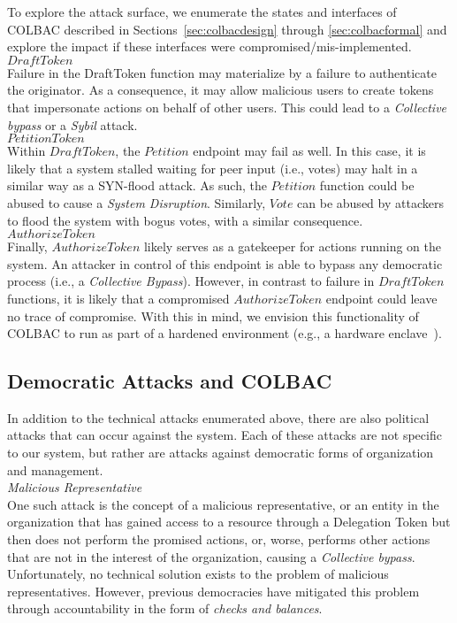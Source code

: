 To explore the attack surface, we enumerate the states and interfaces of
COLBAC described in Sections~\ref{sec:colbacdesign} through 
\ref{sec:colbacformal} and explore the impact if these interfaces were
compromised/mis-implemented.\\

\noindent$DraftToken$\mbox{}\\
Failure in the DraftToken function may materialize by a failure to authenticate
the originator. As a consequence, it may allow malicious users to create tokens
that impersonate actions on behalf of other users. This could lead to a
\emph{Collective bypass} or a \emph{Sybil} attack.\\

\noindent$PetitionToken$\mbox{}\\
Within $DraftToken$, the $Petition$ endpoint may fail as well. In this case, it
is likely that a system stalled waiting for peer input (i.e., votes) may halt
in a similar way as a SYN-flood attack. As such, the $Petition$ function could
be abused to cause a \emph{System Disruption}. Similarly, $Vote$ can be abused
by attackers to flood the system with bogus votes, with a similar consequence.\\

\noindent$AuthorizeToken$\mbox{}\\
Finally, $AuthorizeToken$ likely serves as a gatekeeper for actions running on
the system. An attacker in control of this endpoint is able to bypass any
democratic process (i.e., a \emph{Collective Bypass}). However, in contrast to
failure in $DraftToken$ functions, it is likely that a compromised
$AuthorizeToken$ endpoint could leave no trace of compromise. With this in
mind, we envision this functionality of COLBAC to run as part of a hardened
environment (e.g., a hardware enclave~\cite{sgx}).

\subsection{Democratic Attacks and COLBAC}
In addition to the technical attacks enumerated above, there are also political
attacks that can occur against the system. Each of these attacks are not
specific to our system, but rather are attacks against democratic forms of
organization and management.\\

\noindent\textit{Malicious Representative}\mbox{}\\
One such attack is the concept of a malicious representative, or an entity in
the organization that has gained access to a resource through a Delegation Token
but then does not perform the promised actions, or, worse, performs other
actions that are not in the interest of the organization, causing a
\emph{Collective bypass}. Unfortunately, no technical solution exists to the
problem of malicious representatives. However, previous democracies have
mitigated this problem through accountability in the form of \emph{checks and
balances}.

